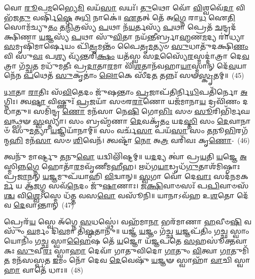 𑌵𑍋 \ul{𑌰𑍂}\-𑌪\-\ul{𑌮}\-𑌭𑍍𑌯𑍈\-\ul{𑌮𑌿} 𑌵𑌯᳴\-\ul{𑌸𑌾} 𑌵𑌯𑌃᳴। \ul{𑌤𑍁}\-𑌥𑍋 𑌵𑍋᳴ \ul{𑌵𑌿}\-𑌶𑍍𑌵𑌵𑍇᳴\-\ul{𑌦𑌾} 𑌵𑌿 𑌭᳴𑌜\-\ul{𑌤𑍁} 𑌵𑌰𑍍\mbox{}𑌷𑌿᳴\-\ul{𑌷𑍍𑌠𑍇} 𑌅\-\ul{𑌧𑌿} 𑌨𑌾𑌕𑍇॑॥ \ul{𑌏}\-𑌤𑌤𑍍 𑌤𑍇᳴ 𑌅\-\ul{𑌗𑍍𑌨𑍇} 𑌰𑌾\-\ul{𑌧} 𑌐\-\ul{𑌤𑌿} 𑌸𑍋𑌮᳴𑌚𑍍𑌯𑍁\-\ul{𑌤𑌂} 𑌤\-\ul{𑌨𑍍𑌮𑌿}\-𑌤𑍍𑌰𑌸𑍍𑌯᳴ \ul{𑌪}\-𑌥𑌾 𑌨᳴\-\ul{𑌯}\-𑌰𑍍𑌤𑌸𑍍𑌯᳴ \ul{𑌪}\-𑌥𑌾 𑌪𑍍𑌰𑍇𑌤᳴ \ul{𑌚}\-𑌨𑍍𑌦𑍍𑌰𑌦᳴𑌕𑍍𑌷𑌿𑌣𑌾 \ul{𑌯}\-𑌜𑍍𑌞𑌸𑍍𑌯᳴ \ul{𑌪}\-𑌥𑌾 𑌸𑍁᳴\-\ul{𑌵𑌿}\-𑌤𑌾 𑌨𑌯᳴𑌨𑍍𑌤𑍀𑌰𑍍𑌬𑍍𑌰𑌾\-\ul{𑌹𑍍𑌮}\-𑌣\-\ul{𑌮}\-𑌦𑍍𑌯 𑌰𑌾॑𑌧𑍍𑌯𑌾\-\ul{𑌸}\-𑌮𑍃𑌷𑌿᳴𑌮𑌾𑌰𑍍\mbox{}\-\ul{𑌷𑍇}\-𑌯𑌂 𑌪𑌿᳴\-\ul{𑌤𑍃}\-𑌮𑌨𑍍𑌤𑌂᳴ 𑌪𑍈𑌤𑍃\-\ul{𑌮}\-𑌤𑍍𑌯𑍞 \ul{𑌸𑍁}\-𑌧𑌾𑌤𑍁᳴𑌦𑌕𑍍𑌷𑌿\-\ul{𑌣𑌂} 𑌵𑌿 𑌸𑍁\-\ul{𑌵𑌃} 𑌪\-\ul{𑌶𑍍𑌯} 𑌵𑍍𑌯᳴𑌨𑍍𑌤𑌰𑌿᳴\-\ul{𑌕𑍍𑌷𑌂} 𑌯𑌤᳴𑌸𑍍𑌵 𑌸\-\ul{𑌦}\-𑌸𑍍𑌯𑍈᳴\-\ul{𑌰}\-𑌸𑍍𑌮𑌦𑍍𑌦𑌾॑𑌤𑍍𑌰𑌾 𑌦𑍇\-\ul{𑌵}\-𑌤𑍍𑌰𑌾 𑌗᳴𑌚𑍍𑌛\-\ul{𑌤} 𑌮𑌧𑍁᳴𑌮𑌤𑍀𑌃 𑌪𑍍𑌰\-\ul{𑌦𑌾}\-𑌤𑌾\-\ul{𑌰}\-𑌮𑌾 𑌵𑌿᳴\-\ul{𑌶}\-𑌤𑌾𑌨᳴𑌵𑌹𑌾\-\ul{𑌯𑌾}\-𑌸𑍍𑌮𑌾𑌨𑍍 𑌦𑍇᳴\-\ul{𑌵}\-𑌯𑌾𑌨𑍇᳴𑌨 \ul{𑌪}\-𑌥𑍇𑌤᳴ \ul{𑌸𑍁}\-𑌕𑍃𑌤𑌾𑌂॑ \ul{𑌲𑍋}\-𑌕𑍇 𑌸𑍀᳴𑌦\-\ul{𑌤} 𑌤𑌨𑍍𑌨𑌃᳴ 𑌸𑍟\-\ul{𑌸𑍍𑌕𑍃}\-𑌤𑌮𑍍॥~(45)

{\anuvakamend[{\-\ul{𑌰𑍂}\-𑌪𑍇𑌣᳴ 𑌸\-\ul{𑌦}\-𑌸𑍍𑌯𑍈᳴\-\ul{𑌰}\-𑌷𑍍𑌟𑌾𑌦᳴𑌶 𑌚}]}%

\-\ul{𑌧𑌾}\-𑌤𑌾 \ul{𑌰𑌾}\-𑌤𑌿𑌃 𑌸᳴\-\ul{𑌵𑌿}\-𑌤𑍇𑌦𑌂 𑌜𑍁᳴𑌷𑌨𑍍𑌤𑌾𑌂 \ul{𑌪𑍍𑌰}\-𑌜𑌾𑌪᳴𑌤𑌿𑌰𑍍𑌨𑌿\-\ul{𑌧𑌿}\-𑌪𑌤𑌿᳴𑌰𑍍𑌨𑍋 \ul{𑌅}\-𑌗𑍍𑌨𑌿𑌃। 𑌤𑍍𑌵\-\ul{𑌷𑍍𑌟𑌾} 𑌵𑌿𑌷𑍍𑌣𑍁𑌃᳴ \ul{𑌪𑍍𑌰}\-𑌜𑌯𑌾᳴ 𑌸𑍞𑌰\-\ul{𑌰𑌾}\-𑌣𑍋 𑌯𑌜᳴𑌮𑌾𑌨𑌾\-\ul{𑌯} 𑌦𑍍𑌰𑌵𑌿᳴𑌣𑌂 𑌦𑌧𑌾𑌤𑍁॥ 𑌸𑌮𑌿᳴𑌨𑍍𑌦𑍍𑌰 \ul{𑌣𑍋} 𑌮𑌨᳴𑌸𑌾 𑌨𑍇\-\ul{𑌷𑌿} 𑌗𑍋\-\ul{𑌭𑌿𑌃} 𑌸𑍞 \ul{𑌸𑍂}\-𑌰𑌿𑌭𑌿᳴𑌰𑍍𑌮𑌘\-\ul{𑌵}\-𑌨𑍍𑌥𑍍𑌸𑍟 \ul{𑌸𑍍𑌵}\-𑌸𑍍𑌤𑍍𑌯𑌾। 𑌸𑌂 𑌬𑍍𑌰𑌹𑍍𑌮᳴𑌣𑌾 \ul{𑌦𑍇}\-𑌵𑌕𑍃᳴\-\ul{𑌤𑌂} 𑌯𑌦\-\ul{𑌸𑍍𑌤𑌿} 𑌸𑌂 \ul{𑌦𑍇}\-𑌵𑌾𑌨𑌾𑍞᳴ 𑌸𑍁\-\ul{𑌮}\-𑌤𑍍𑌯𑌾 \ul{𑌯}\-𑌜𑍍𑌞𑌿𑌯𑌾᳴𑌨𑌾𑌮𑍍॥ 𑌸𑌂 𑌵𑌰𑍍𑌚᳴\-\ul{𑌸𑌾} 𑌪𑌯᳴\-\ul{𑌸𑌾} 𑌸𑌂 \ul{𑌤}\-𑌨𑍂\-\ul{𑌭𑌿}\-𑌰𑌗᳴𑌨𑍍𑌮\-\ul{𑌹𑌿} 𑌮𑌨᳴\-\ul{𑌸𑌾} 𑌸𑍞 \ul{𑌶𑌿}\-𑌵𑍇𑌨᳴। 𑌤𑍍𑌵𑌷𑍍𑌟𑌾᳴ \ul{𑌨𑍋} 𑌅\-\ul{𑌤𑍍𑌰} 𑌵𑌰𑌿᳴𑌵𑌃 𑌕𑍃\-\ul{𑌣𑍋}\--~(46)

𑌤𑍍𑌵𑌨𑍁᳴ 𑌮𑌾𑌰𑍍𑌷𑍍𑌟𑍁 \ul{𑌤}\-𑌨𑍁\-\ul{𑌵𑍋} 𑌯𑌦𑍍𑌵𑌿𑌲𑌿᳴𑌷𑍍𑌟𑌮𑍍॥ 𑌯\-\ul{𑌦}\-𑌦𑍍𑌯 𑌤𑍍𑌵𑌾॑ 𑌪𑍍𑌰\-\ul{𑌯}\-𑌤𑌿 \ul{𑌯}\-𑌜𑍍𑌞𑍇 \ul{𑌅}\-𑌸𑍍𑌮𑌿𑌨𑍍𑌨\-\ul{𑌗𑍍𑌨𑍇} 𑌹𑍋𑌤𑌾᳴\-\ul{𑌰}\-𑌮𑌵𑍃᳴𑌣𑍀𑌮\-\ul{𑌹𑍀}\-𑌹। 𑌋𑌧᳴𑌗\-\ul{𑌯𑌾}\-𑌡𑍃𑌧᳴\-\ul{𑌗𑍁}\-𑌤𑌾𑌶᳴𑌮𑌿𑌷𑍍𑌠𑌾𑌃 𑌪𑍍𑌰\-\ul{𑌜𑌾}\-𑌨𑌨𑍍 \ul{𑌯}\-𑌜𑍍𑌞𑌮𑍁𑌪᳴𑌯𑌾𑌹𑌿 \ul{𑌵𑌿}\-𑌦𑍍𑌵𑌾𑌨𑍍॥ \ul{𑌸𑍍𑌵}\-𑌗𑌾 𑌵𑍋᳴ 𑌦𑍇\-\ul{𑌵𑌾𑌃} 𑌸𑌦᳴𑌨𑌮𑌕\-\ul{𑌰𑍍𑌮} 𑌯 𑌆᳴\-\ul{𑌜}\-𑌗𑍍𑌮 𑌸𑌵᳴\-\ul{𑌨𑍇}\-𑌦𑌂 𑌜𑍁᳴\-\ul{𑌷𑌾}\-𑌣𑌾𑌃। \ul{𑌜}\-\-\ul{𑌕𑍍𑌷𑌿}\-𑌵𑌾𑍞𑌸𑌃᳴ 𑌪\-\ul{𑌪𑌿}\-𑌵𑌾𑍞𑌸᳴\-\ul{𑌶𑍍𑌚} 𑌵𑌿\-\ul{𑌶𑍍𑌵𑍇}\-\-𑌽𑌸𑍍𑌮𑍇 𑌧᳴𑌤𑍍𑌤 𑌵𑌸\-\ul{𑌵𑍋} 𑌵𑌸𑍂᳴𑌨𑌿॥ 𑌯𑌾𑌨𑌾\-𑌽𑌵᳴𑌹 𑌉\-\ul{𑌶}\-𑌤𑍋 𑌦𑍇᳴𑌵 \ul{𑌦𑍇}\-𑌵𑌾𑌨𑍍𑌤𑌾𑌨𑍍~(47)

𑌪𑍍𑌰𑍇𑌰᳴\-\ul{𑌯} 𑌸𑍍𑌵𑍇 𑌅᳴𑌗𑍍𑌨𑍇 \ul{𑌸}\-𑌧𑌸𑍍𑌥𑍇॑। 𑌵𑌹᳴𑌮𑌾\-\ul{𑌨𑌾} 𑌭𑌰᳴𑌮𑌾𑌣𑌾 \ul{𑌹}\-𑌵𑍀𑍞\-\ul{𑌷𑌿} 𑌵𑌸𑍁𑌂᳴ \ul{𑌘}\-𑌰𑍍𑌮𑌂 𑌦𑌿\-\ul{𑌵}\-𑌮𑌾 𑌤𑌿᳴\-\ul{𑌷𑍍𑌠}\-𑌤𑌾𑌨𑍁᳴॥ 𑌯𑌜𑍍𑌞᳴ \ul{𑌯}\-𑌜𑍍𑌞𑌂 𑌗᳴𑌚𑍍𑌛 \ul{𑌯}\-𑌜𑍍𑌞𑌪᳴𑌤𑌿𑌂 𑌗\-\ul{𑌚𑍍𑌛} 𑌸𑍍𑌵𑌾𑌂 𑌯𑍋𑌨𑌿𑌂᳴ 𑌗\-\ul{𑌚𑍍𑌛} 𑌸𑍍𑌵𑌾\-\ul{𑌹𑍈}\-𑌷 𑌤𑍇᳴ \ul{𑌯}\-𑌜𑍍𑌞𑍋 𑌯᳴𑌜𑍍𑌞𑌪𑌤𑍇 \ul{𑌸}\-𑌹𑌸𑍂॑𑌕𑍍𑌤𑌵𑌾𑌕𑌃 \ul{𑌸𑍁}\-𑌵𑍀\-\ul{𑌰𑌃} 𑌸𑍍𑌵𑌾\-\ul{𑌹𑌾} 𑌦𑍇𑌵𑌾᳴ 𑌗𑌾𑌤𑍁𑌵𑌿𑌦𑍋 \ul{𑌗𑌾}\-𑌤𑍁𑌂 \ul{𑌵𑌿}\-𑌤𑍍𑌵𑌾 \ul{𑌗𑌾}\-𑌤𑍁𑌮𑌿᳴\-\ul{𑌤} 𑌮𑌨᳴𑌸𑌸𑍍𑌪𑌤 \ul{𑌇}\-𑌮𑌂 𑌨𑍋᳴ 𑌦𑍇𑌵 \ul{𑌦𑍇}\-𑌵𑍇𑌷𑍁᳴ \ul{𑌯}\-𑌜𑍍𑌞𑍟 𑌸𑍍𑌵𑌾𑌹𑌾᳴ \ul{𑌵𑌾}\-𑌚𑌿 𑌸𑍍𑌵𑌾\-\ul{𑌹𑌾} 𑌵𑌾𑌤𑍇᳴ 𑌧𑌾𑌃॥~(48)

